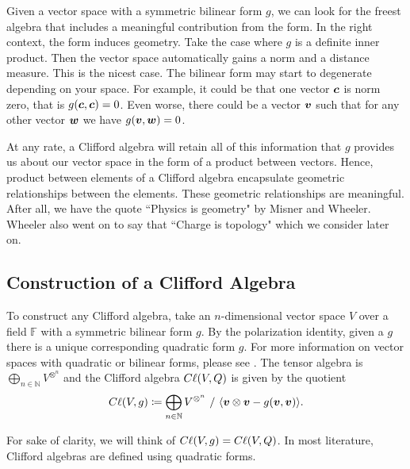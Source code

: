 \documentclass{article}
\begin{document}
Given a vector space with a symmetric bilinear form $g$, we can look for the freest algebra that includes a meaningful contribution from the form. In the right context, the form induces geometry. Take the case where $g$ is a definite inner product. Then the vector space automatically gains a norm and a distance measure. This is the nicest case. The bilinear form may start to degenerate depending on your space. For example, it could be that one vector $\boldsymbol{c}$ is norm zero, that is $g(\boldsymbol{c},\boldsymbol{c})=0$. Even worse, there could be a vector $\boldsymbol{v}$ such that for any other vector $\boldsymbol{w}$ we have $g(\boldsymbol{v},\boldsymbol{w})=0$. 

At any rate, a Clifford algebra will retain all of this information that $g$ provides us about our vector space in the form of a product between vectors. Hence, product between elements of a Clifford algebra encapsulate geometric relationships between the elements. These geometric relationships are meaningful. After all, we have the quote ``Physics is geometry" by Misner and Wheeler. Wheeler also went on to say that ``Charge is topology" which we consider later on.

\subsection{Construction of a Clifford Algebra}

To construct any Clifford algebra, take an $n$-dimensional vector space $V$ over a field $\mathbb{F}$ with a symmetric bilinear form $g$. By the polarization identity, given a $g$ there is a unique corresponding quadratic form $g$. For more information on vector spaces with quadratic or bilinear forms, please see \cite{roman_metric_2008}. The tensor algebra is $\bigoplus_{n \in \mathbb{N}} V^{\otimes^n}$ and the Clifford algebra $C\ell(V,Q)$ is given by the quotient
\begin{equation}
\label{eq:ideal_quotient}
C\ell(V,g) \coloneqq \bigoplus_{n \in \mathbb{N}} V^{\otimes^n} ~ / ~ \langle \boldsymbol{v} \otimes \boldsymbol{v} - g(\boldsymbol{v},\boldsymbol{v}) \rangle.
\end{equation}

\begin{remark}
For sake of clarity, we will think of $C\ell(V,g)=C\ell(V,Q)$. In most literature, Clifford algebras are defined using quadratic forms. 
\end{remark}
\end{document}
